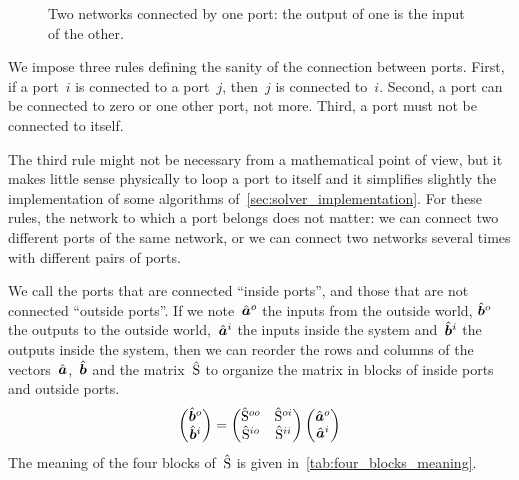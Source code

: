 \begin{figure}[b]
    \centering
    
    \caption{Two networks connected by one port: the output of one is the input of the other.}
    \label{fig:output_g_is_input_h}
\end{figure}

We impose three rules defining the sanity of the connection between ports.
First, if a port~$i$ is connected to a port~$j$, then~$j$ is connected to~$i$.
Second, a port can be connected to zero or one other port, not more.
Third, a port must not be connected to itself.

The third rule might not be necessary from a mathematical point of view, but it makes little sense physically to loop a port to itself and it simplifies slightly the implementation of some algorithms of~\cref{sec:solver_implementation}.
For these rules, the network to which a port belongs does not matter: we can connect two different ports of the same network, or we can connect two networks several times with different pairs of ports.

We call the ports that are connected ``inside ports'', and those that are not connected ``outside ports''.
If we note~$\hat{\bm{a}}^o$ the inputs from the outside world,
$\hat{\bm{b}}^o$ the outputs to the outside world,~$\hat{\bm{a}}^i$ the inputs inside the system and~$\hat{\bm{b}}^i$ the outputs inside the system, then we can reorder the rows and columns of the vectors~$\hat{\bm{a}}$,~$\hat{\bm{b}}$ and the matrix~$\hat{\mathrm{S}}$ to organize the matrix in blocks of inside ports and outside ports.
\begin{equation}
    \begin{pmatrix}
        \hat{\bm{b}}^o\\
        \hat{\bm{b}}^i
    \end{pmatrix}
    =
    \begin{pmatrix}
        \hat{\mathrm{S}}^{oo} & \hat{\mathrm{S}}^{oi} \\
        \hat{\mathrm{S}}^{io} & \hat{\mathrm{S}}^{ii} \\
    \end{pmatrix}
    \begin{pmatrix}
        \hat{\bm{a}}^o\\
        \hat{\bm{a}}^i
    \end{pmatrix}
    \label{eq:s_outside_inside}
\end{equation}
The meaning of the four blocks of~$\hat{\mathrm{S}}$ is given in~\cref{tab:four_blocks_meaning}.

